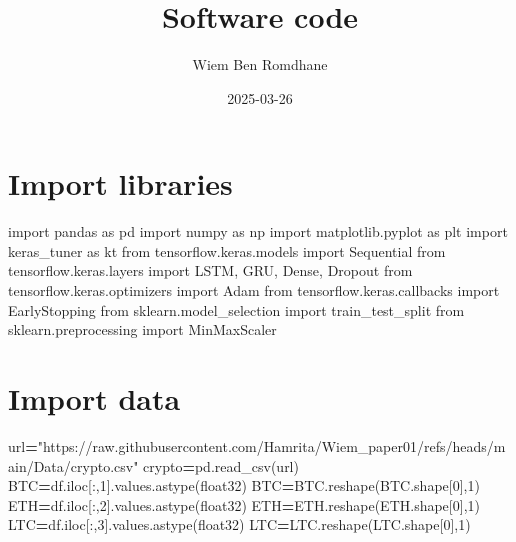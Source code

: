 \documentclass[
]{article}
\title{Software code}
\author{Wiem Ben Romdhane}
\date{2025-03-26}
\newenvironment{Shaded}{\begin{snugshade}}{\end{snugshade}}
\newcommand{\DecValTok}[1]{\textcolor[rgb]{0.00,0.00,0.81}{#1}}
\newcommand{\ImportTok}[1]{#1}
\newcommand{\NormalTok}[1]{#1}
\newcommand{\OperatorTok}[1]{\textcolor[rgb]{0.81,0.36,0.00}{\textbf{#1}}}
\newcommand{\StringTok}[1]{\textcolor[rgb]{0.31,0.60,0.02}{#1}}
\begin{document}
\maketitle

\section{Import libraries}\label{import-libraries}

\begin{Shaded}
\begin{Highlighting}[]
\ImportTok{import}\NormalTok{ pandas }\ImportTok{as}\NormalTok{ pd}
\ImportTok{import}\NormalTok{ numpy }\ImportTok{as}\NormalTok{ np}
\ImportTok{import}\NormalTok{ matplotlib.pyplot }\ImportTok{as}\NormalTok{ plt}
\ImportTok{import}\NormalTok{ keras\_tuner }\ImportTok{as}\NormalTok{ kt}
\ImportTok{from}\NormalTok{ tensorflow.keras.models }\ImportTok{import}\NormalTok{ Sequential}
\ImportTok{from}\NormalTok{ tensorflow.keras.layers }\ImportTok{import}\NormalTok{ LSTM, GRU, Dense, Dropout}
\ImportTok{from}\NormalTok{ tensorflow.keras.optimizers }\ImportTok{import}\NormalTok{ Adam}
\ImportTok{from}\NormalTok{ tensorflow.keras.callbacks }\ImportTok{import}\NormalTok{ EarlyStopping}
\ImportTok{from}\NormalTok{ sklearn.model\_selection }\ImportTok{import}\NormalTok{ train\_test\_split}
\ImportTok{from}\NormalTok{ sklearn.preprocessing }\ImportTok{import}\NormalTok{ MinMaxScaler}
\end{Highlighting}
\end{Shaded}

\section{Import data}\label{import-data}

\begin{Shaded}
\begin{Highlighting}[]
\NormalTok{url}\OperatorTok{=}\StringTok{"https://raw.githubusercontent.com/Hamrita/Wiem\_paper01/refs/heads/main/Data/crypto.csv"}
\NormalTok{crypto}\OperatorTok{=}\NormalTok{pd.read\_csv(url)}
\NormalTok{BTC}\OperatorTok{=}\NormalTok{df.iloc[:,}\DecValTok{1}\NormalTok{].values.astype(}\StringTok{\textquotesingle{}float32\textquotesingle{}}\NormalTok{)}
\NormalTok{BTC}\OperatorTok{=}\NormalTok{BTC.reshape(BTC.shape[}\DecValTok{0}\NormalTok{],}\DecValTok{1}\NormalTok{)}
\NormalTok{ETH}\OperatorTok{=}\NormalTok{df.iloc[:,}\DecValTok{2}\NormalTok{].values.astype(}\StringTok{\textquotesingle{}float32\textquotesingle{}}\NormalTok{)}
\NormalTok{ETH}\OperatorTok{=}\NormalTok{ETH.reshape(ETH.shape[}\DecValTok{0}\NormalTok{],}\DecValTok{1}\NormalTok{)}
\NormalTok{LTC}\OperatorTok{=}\NormalTok{df.iloc[:,}\DecValTok{3}\NormalTok{].values.astype(}\StringTok{\textquotesingle{}float32\textquotesingle{}}\NormalTok{)}
\NormalTok{LTC}\OperatorTok{=}\NormalTok{LTC.reshape(LTC.shape[}\DecValTok{0}\NormalTok{],}\DecValTok{1}\NormalTok{)}
\end{Highlighting}
\end{Shaded}
\end{document}
